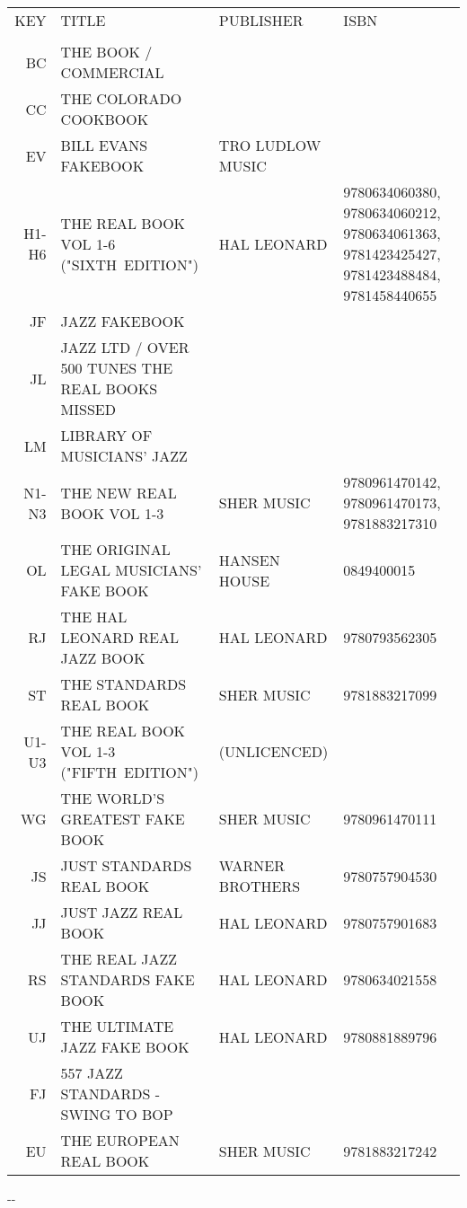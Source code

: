 \documentclass[8pt]{scrartcl}
\begin{document}
\selectfont
\begin{center}
  \begin{tabular}{rp{}p{}p{}}%
    KEY   & TITLE                                           & PUBLISHER        & ISBN \\
          &                                                 &                  & \\
    BC    & THE BOOK / COMMERCIAL                           &                  & \\
    CC    & THE COLORADO COOKBOOK                           &                  & \\
    EV    & BILL EVANS FAKEBOOK                             & TRO LUDLOW MUSIC & \\
    H1-H6 & THE REAL BOOK VOL 1-6 ("SIXTH~EDITION")         & HAL LEONARD      & 9780634060380, 9780634060212, 9780634061363, 9781423425427, 9781423488484, 9781458440655 \\
    JF    & JAZZ FAKEBOOK                                   &                  & \\
    JL    & JAZZ LTD / OVER 500 TUNES THE REAL BOOKS MISSED &                  & \\
    LM    & LIBRARY OF MUSICIANS’ JAZZ                      &                  & \\
    N1-N3 & THE NEW REAL BOOK VOL 1-3                       & SHER MUSIC       & 9780961470142, 9780961470173, 9781883217310 \\
    OL    & THE ORIGINAL LEGAL MUSICIANS' FAKE BOOK         & HANSEN HOUSE     & 0849400015 \\
    RJ    & THE HAL LEONARD REAL JAZZ BOOK                  & HAL LEONARD      & 9780793562305 \\
    ST    & THE STANDARDS REAL BOOK                         & SHER MUSIC       & 9781883217099 \\
    U1-U3 & THE REAL BOOK VOL 1-3 ("FIFTH~EDITION")         & (UNLICENCED)     & \\
    WG    & THE WORLD'S GREATEST FAKE BOOK                  & SHER MUSIC       & 9780961470111 \\
    JS    & JUST STANDARDS REAL BOOK                        & WARNER BROTHERS  & 9780757904530 \\
    JJ    & JUST JAZZ REAL BOOK                             & HAL LEONARD      & 9780757901683 \\
    RS    & THE REAL JAZZ STANDARDS FAKE BOOK               & HAL LEONARD      & 9780634021558 \\
    UJ    & THE ULTIMATE JAZZ FAKE BOOK                     & HAL LEONARD      & 9780881889796 \\
    FJ    & 557 JAZZ STANDARDS - SWING TO BOP               &                  & \\
    EU    & THE EUROPEAN REAL BOOK                          & SHER MUSIC       & 9781883217242 \\
  \end{tabular}
\end{center}

\begin{multicols}{3}
  \raggedright
  
\end{multicols}

\begin{center}
  \the\year-\the\month-\the\day
\end{center}
\end{document}
